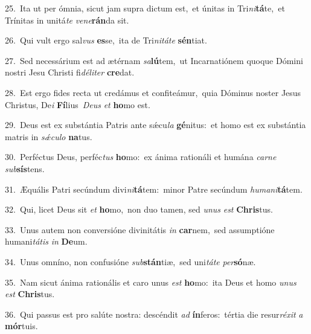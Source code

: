 {\numbfont\textcolor{\numbcolor}{25.}}~Ita ut per ómnia, sicut jam supra dictum est,~\dagger et únitas in Tri\-\textit{ni}\-\textbf{tá}te,~\star et Trínitas in unitá\textit{te} \textit{ve}\-\textit{ne}\textbf{rán}da sit.\par
{\numbfont\textcolor{\numbcolor}{26.}}~Qui vult ergo sal\textit{vus} \textbf{es}\-se,~\star ita de Tri\-\textit{ni}\-\textit{tá}\textit{te} \textbf{sén}\-tiat.\par
{\numbfont\textcolor{\numbcolor}{27.}}~Sed necessárium est ad ætérnam \textit{sa}\-\textbf{lú}tem,~\star ut Incarnatiónem quoque Dómini nostri Jesu Christi fi\-\textit{dé}\-\textit{li}\textit{ter} \textbf{cre}\-dat.\par
{\numbfont\textcolor{\numbcolor}{28.}}~Est ergo fides recta ut credámus et confiteámur,~\dagger quia Dóminus noster Jesus Christus, De\textit{i} \textbf{Fí}\-lius~\star \textit{De}\-\textit{us} \textit{et} \textbf{ho}\-mo est.\par
{\numbfont\textcolor{\numbcolor}{29.}}~Deus est ex substántia Patris ante sǽcu\textit{la} \textbf{gé}\-nitus:~\star et homo est ex substántia matris in \textit{sǽ}\-\textit{cu}\textit{lo} \textbf{na}\-tus.\par
{\numbfont\textcolor{\numbcolor}{30.}}~Perféctus Deus, perféc\textit{tus} \textbf{ho}\-mo:~\star ex ánima rationáli et humána \textit{car}\-\textit{ne} \textit{sub}\-\textbf{sís}tens.\par
{\numbfont\textcolor{\numbcolor}{31.}}~Æquális Patri secúndum divi\-\textit{ni}\-\textbf{tá}tem:~\star minor Patre secúndum \textit{hu}\-\textit{ma}\textit{ni}\textbf{tá}tem.\par
{\numbfont\textcolor{\numbcolor}{32.}}~Qui, licet Deus sit \textit{et} \textbf{ho}\-mo,~\star non duo tamen, sed \textit{u}\-\textit{nus} \textit{est} \textbf{Chris}\-tus.\par
{\numbfont\textcolor{\numbcolor}{33.}}~Unus autem non conversióne divinitátis \textit{in} \textbf{car}\-nem,~\star sed assumptióne humani\-\textit{tá}\-\textit{tis} \textit{in} \textbf{De}\-um.\par
{\numbfont\textcolor{\numbcolor}{34.}}~Unus omníno, non confusióne \textit{sub}\-\textbf{stán}tiæ,~\star sed uni\-\textit{tá}\-\textit{te} \textit{per}\-\textbf{só}næ.\par
{\numbfont\textcolor{\numbcolor}{35.}}~Nam sicut ánima rationális et caro unus \textit{est} \textbf{ho}\-mo:~\star ita Deus et homo \textit{u}\-\textit{nus} \textit{est} \textbf{Chris}\-tus.\par
{\numbfont\textcolor{\numbcolor}{36.}}~Qui passus est pro salúte nostra: descéndit \textit{ad} \textbf{ín}\-feros:~\star tértia die resur\-\textit{ré}\-\textit{xit} \textit{a} \textbf{mór}\-tuis.\par
